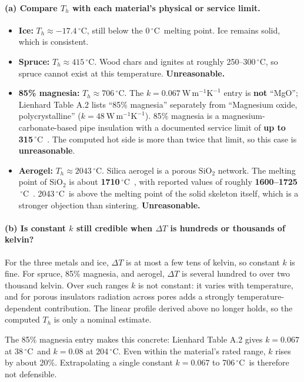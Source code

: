 \documentclass[reprint, amsmath, amssymb, aps, prl]{revtex4-2}
\newcommand{\degC}{\ensuremath{\,^\circ\mathrm{C}}}
\newcommand{\WmK}{\mathrm{W\,m^{-1}K^{-1}}}
\begin{document}
\paragraph*{(a) Compare $T_h$ with each material's physical or service limit.}
\begin{itemize}
\item \textbf{Ice:} $T_h\approx-17.4\degC$, still below the 0\degC\ melting point. Ice
remains solid, which is consistent.
\item \textbf{Spruce:} $T_h\approx415\degC$. Wood chars and ignites at roughly
250--300\degC, so spruce cannot exist at this temperature. \textbf{Unreasonable.}
\item \textbf{85\% magnesia:} $T_h\approx706\degC$. The $k=0.067~\WmK$ entry is
\textbf{not} ``MgO''; Lienhard Table A.2 lists ``85\% magnesia'' separately from
``Magnesium oxide, polycrystalline'' ($k=48~\WmK$). 85\% magnesia is a
magnesium-carbonate-based pipe insulation with a documented service limit of
\textbf{up to 315\degC}~\cite{magnesia}. The computed hot side is more than twice that
limit, so this case is \textbf{unreasonable}.
\item \textbf{Aerogel:} $T_h\approx2043\degC$. Silica aerogel is a porous
$\mathrm{SiO_2}$ network. The melting point of $\mathrm{SiO_2}$ is about
\textbf{1710\degC}~\cite{sio2mp}, with reported values of roughly
\textbf{1600--1725\degC}~\cite{sio2range}. 2043\degC\ is above the melting point of the
solid skeleton itself, which is a stronger objection than sintering.
\textbf{Unreasonable.}
\end{itemize}

\paragraph*{(b) Is constant $k$ still credible when $\Delta T$ is hundreds or thousands of kelvin?}
For the three metals and ice, $\Delta T$ is at most a few tens of kelvin, so constant $k$
is fine. For spruce, 85\% magnesia, and aerogel, $\Delta T$ is several hundred to over two
thousand kelvin. Over such ranges $k$ is not constant: it varies with temperature, and for
porous insulators radiation across pores adds a strongly temperature-dependent
contribution. The linear profile derived above no longer holds, so the computed $T_h$ is
only a nominal estimate.

The 85\% magnesia entry makes this concrete: Lienhard Table A.2 gives $k=0.067$ at
38\degC\ and $k=0.08$ at 204\degC. Even within the material's rated range, $k$ rises by
about 20\%. Extrapolating a single constant $k=0.067$ to 706\degC\ is therefore not
defensible.
\end{document}
